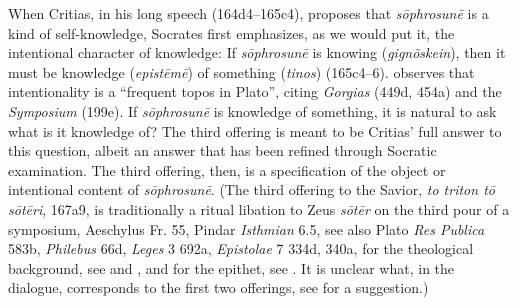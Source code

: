 When Critias, in his long speech (164d4–165c4), proposes that \emph{sōphrosunē} is a kind of self-knowledge, Socrates first emphasizes, as we would put it, the intentional character of knowledge: If \emph{sōphrosunē} is knowing (\emph{gignõskein}), then it must be knowledge (\emph{epistēmē}) of something (\emph{tinos}) (165c4–6). \citet[232]{Kosman:2014aa} observes that intentionality is a ``frequent topos in Plato'', citing \emph{Gorgias} (449d, 454a) and the \emph{Symposium} (199e). If \emph{sōphrosunē} is knowledge of something, it is natural to ask what is it knowledge of? The third offering is meant to be Critias' full answer to this question, albeit an answer that has been refined through Socratic examination. The third offering, then, is a specification of the object or intentional content of \emph{sōphrosunē}. (The third offering to the Savior, \emph{to triton tō sōtēri}, 167a9, is traditionally a ritual libation to Zeus \emph{sōtēr} on the third pour of a symposium, Aeschylus Fr. 55, Pindar \emph{Isthmian} 6.5, see also Plato \emph{Res Publica} 583b, \emph{Philebus} 66d, \emph{Leges} 3 692a, \emph{Epistolae} 7 334d, 340a, for the theological background, see \citealt{Cook:1914la} and  \citealt{Jim:2022ay}, and for the epithet, see \citealt{Rothrauff:1966nh}. It is unclear what, in the dialogue, corresponds to the first two offerings, see \citealt[23 n71]{Moore:2019aa} for a suggestion.)


